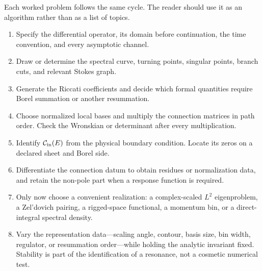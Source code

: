 Each worked problem follows the same cycle.  The reader should use it as an
algorithm rather than as a list of topics.

\begin{enumerate}
  \item Specify the differential operator, its domain before continuation,
  the time convention, and every asymptotic channel.

  \item Draw or determine the spectral curve, turning points, singular
  points, branch cuts, and relevant Stokes graph.

  \item Generate the Riccati coefficients and decide which formal quantities
  require Borel summation or another resummation.

  \item Choose normalized local bases and multiply the connection matrices in
  path order.  Check the Wronskian or determinant after every multiplication.

  \item Identify $\mathcal{C}_{\mathrm{in}}(E)$ from the physical boundary
  condition.  Locate its zeros on a declared sheet and Borel side.

  \item Differentiate the connection datum to obtain residues or
  normalization data, and retain the non-pole part when a response function
  is required.

  \item Only now choose a convenient realization: a complex-scaled $L^2$
  eigenproblem, a Zel'dovich pairing, a rigged-space functional, a momentum
  bin, or a direct-integral spectral density.

  \item Vary the representation data---scaling angle, contour, basis size,
  bin width, regulator, or resummation order---while holding the analytic
  invariant fixed.  Stability is part of the identification of a resonance,
  not a cosmetic numerical test.
\end{enumerate}

